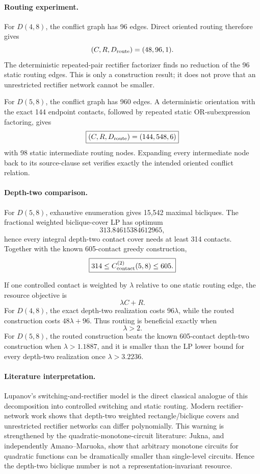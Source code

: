 \paragraph{Routing experiment.}
For \(D(4,8)\), the conflict graph has 96 edges. Direct oriented routing therefore gives
\[
(C,R,D_{\rm route})=(48,96,1).
\]
The deterministic repeated-pair rectifier factorizer finds no reduction of the 96 static
routing edges. This is only a construction result; it does not prove that an unrestricted
rectifier network cannot be smaller.

For \(D(5,8)\), the conflict graph has 960 edges. A deterministic orientation with the exact
144 endpoint contacts, followed by repeated static OR-subexpression factoring, gives
\[
\boxed{
(C,R,D_{\rm route})=(144,548,6)
}
\]
with 98 static intermediate routing nodes. Expanding every intermediate node back to its
source-clause set verifies exactly the intended oriented conflict relation.

\paragraph{Depth-two comparison.}
For \(D(5,8)\), exhaustive enumeration gives 15,542 maximal bicliques. The fractional
weighted biclique-cover LP has optimum
\[
313.84615384612965,
\]
hence every integral depth-two contact cover needs at least 314 contacts. Together with the
known 605-contact greedy construction,
\[
\boxed{
314\le C_{\rm contact}^{(2)}(5,8)\le605.
}
\]

If one controlled contact is weighted by \(\lambda\) relative to one static routing edge, the
resource objective is
\[
\lambda C+R.
\]
For \(D(4,8)\), the exact depth-two realization costs \(96\lambda\), while the routed
construction costs \(48\lambda+96\). Thus routing is beneficial exactly when
\[
\lambda>2.
\]
For \(D(5,8)\), the routed construction beats the known 605-contact depth-two construction
when \(\lambda>1.1887\), and it is smaller than the LP lower bound for every depth-two
realization once \(\lambda>3.2236\).

\paragraph{Literature interpretation.}
Lupanov's switching-and-rectifier model is the direct classical analogue of this
decomposition into controlled switching and static routing. Modern rectifier-network work
shows that depth-two weighted rectangle/biclique covers and unrestricted rectifier networks
can differ polynomially. This warning is strengthened by the quadratic-monotone-circuit
literature: Jukna, and independently Amano--Maruoka, show that arbitrary monotone circuits
for quadratic functions can be dramatically smaller than single-level circuits. Hence the
depth-two biclique number is not a representation-invariant resource.

